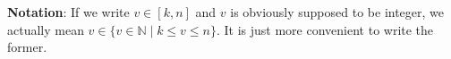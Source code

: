 \documentclass{article}
\begin{document}
	
	
	\sloppy
	
	
	\textbf{Notation}: If we write $ v \in [k,n] $ and $v$ is obviously supposed to be integer, we actually mean $v \in \{v \in \mathbb{N} \mid k \leq v \leq n\}$. It is just more convenient to write the former.
	
	
	\clearpage
	
	
	
	 
	
	
\end{document}
